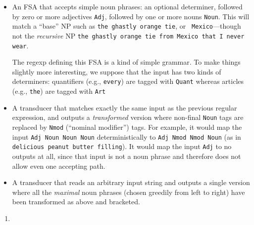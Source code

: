 \documentclass[11pt]{article}
\begin{document}
\begin{enumerate}[resume]
\begin{itemize}
  \item An FSA that accepts simple noun phrases: an optional
    determiner, followed by zero or more adjectives \texttt{Adj},
    followed by one or more nouns \texttt{Noun}.  This will match a
    ``base'' NP such as {\tt the ghastly orange tie}, or {\tt
      Mexico}---though not the {\em recursive} NP {\tt the ghastly orange
      tie from Mexico that I never wear}.

    The regexp defining this FSA is a kind of simple grammar.  To make
    things slightly more interesting, we suppose that the input has
    two kinds of determiners: quantifiers (e.g., {\tt every}) are
    tagged with \texttt{Quant} whereas articles (e.g., {\tt the}) are
    tagged with \texttt{Art}

  \item A transducer that matches exactly the same input as the
    previous regular expression, and outputs a {\em transformed}
    version where non-final \texttt{Noun} tags are replaced by
    \texttt{Nmod} (``nominal modifier'') tags. For example, it would map
    the input \texttt{Adj Noun Noun Noun} deterministically to
    \texttt{Adj Nmod Nmod Noun} (as in {\tt delicious peanut butter
      filling}).  It would map the input \texttt{Adj} to no outputs at
    all, since that input is not a noun phrase and therefore does not
    allow even one accepting path.

  \item A transducer that reads an arbitrary input string and outputs
    a single version where all the {\em maximal} noun phrases (chosen
    greedily from left to right) have been transformed as above and
    bracketed.


  \end{itemize}


  \begin{enumerate}
  \item \label{q:nounphrase}


\end{enumerate}
\end{enumerate}
\end{document}
